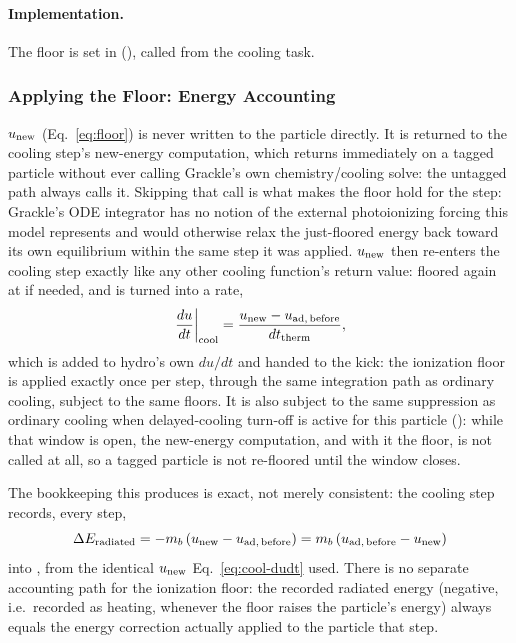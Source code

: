 \paragraph{Implementation.} The floor is set in 
(), called from the
cooling task.

\subsubsection{Applying the Floor: Energy Accounting}

$u_{\rm new}$
(Eq.~\ref{eq:floor}) is never written to the particle directly.
It is returned to the cooling step's new-energy computation, which returns
immediately on a tagged particle without ever calling Grackle's own
chemistry/cooling solve: the
untagged path always calls it. Skipping that call is what makes the
floor hold for the step: Grackle's ODE integrator has no notion of the
external photoionizing forcing this model represents and would
otherwise relax the just-floored energy back toward its own
equilibrium within the same step it was applied. $u_{\rm new}$ then
re-enters the cooling step exactly like any other cooling
function's return value: floored again at
 if needed, and is
turned into a rate,
\begin{equation}
  \left.\frac{du}{dt}\right|_{\rm cool} =
  \frac{u_{\rm new} - u_{\rm ad,\,before}}{dt_{\rm therm}},
  \label{eq:cool-dudt}
\end{equation}
which is added to hydro's own $du/dt$ and handed to the kick: the
ionization floor is applied exactly once per step, through the same
integration path as ordinary cooling, subject to the same floors. It
is also subject to the same suppression as ordinary cooling when
 delayed-cooling turn-off is active for
this particle (): while
that window is open, the new-energy computation, and with it the floor,
is not called at all, so a
tagged particle is not re-floored until the window closes.

The bookkeeping this produces is exact, not merely consistent:
the cooling step records, every step,
\begin{equation}
  \Delta E_{\rm radiated} = -m_b\left(u_{\rm new} - u_{\rm ad,\,before}\right)
  = m_b\left(u_{\rm ad,\,before} - u_{\rm new}\right)
\end{equation}
into , from the identical
$u_{\rm new}$ Eq.~\ref{eq:cool-dudt} used. There is no separate
accounting path for the ionization floor: the recorded
radiated energy (negative, i.e.\ recorded as heating, whenever the
floor raises the particle's energy) always equals the energy
correction actually applied to the particle that step.

